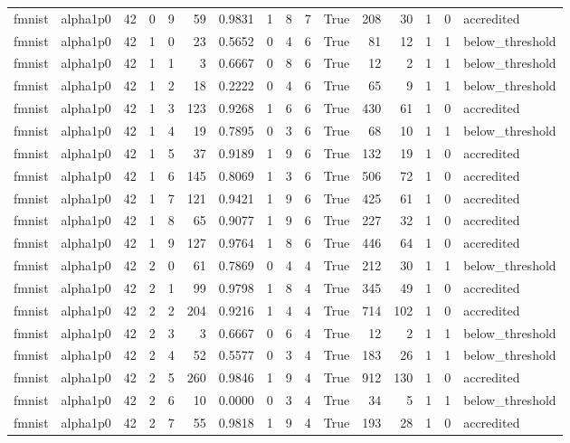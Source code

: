 \begin{tabular}{llrrrrrrrrrrrrrl}
fmnist & alpha1p0 & 42 & 0 & 9 & 59 & 0.9831 & 1 & 8 & 7 & True & 208 & 30 & 1 & 0 & accredited \\
fmnist & alpha1p0 & 42 & 1 & 0 & 23 & 0.5652 & 0 & 4 & 6 & True & 81 & 12 & 1 & 1 & below\_threshold \\
fmnist & alpha1p0 & 42 & 1 & 1 & 3 & 0.6667 & 0 & 8 & 6 & True & 12 & 2 & 1 & 1 & below\_threshold \\
fmnist & alpha1p0 & 42 & 1 & 2 & 18 & 0.2222 & 0 & 4 & 6 & True & 65 & 9 & 1 & 1 & below\_threshold \\
fmnist & alpha1p0 & 42 & 1 & 3 & 123 & 0.9268 & 1 & 6 & 6 & True & 430 & 61 & 1 & 0 & accredited \\
fmnist & alpha1p0 & 42 & 1 & 4 & 19 & 0.7895 & 0 & 3 & 6 & True & 68 & 10 & 1 & 1 & below\_threshold \\
fmnist & alpha1p0 & 42 & 1 & 5 & 37 & 0.9189 & 1 & 9 & 6 & True & 132 & 19 & 1 & 0 & accredited \\
fmnist & alpha1p0 & 42 & 1 & 6 & 145 & 0.8069 & 1 & 3 & 6 & True & 506 & 72 & 1 & 0 & accredited \\
fmnist & alpha1p0 & 42 & 1 & 7 & 121 & 0.9421 & 1 & 9 & 6 & True & 425 & 61 & 1 & 0 & accredited \\
fmnist & alpha1p0 & 42 & 1 & 8 & 65 & 0.9077 & 1 & 9 & 6 & True & 227 & 32 & 1 & 0 & accredited \\
fmnist & alpha1p0 & 42 & 1 & 9 & 127 & 0.9764 & 1 & 8 & 6 & True & 446 & 64 & 1 & 0 & accredited \\
fmnist & alpha1p0 & 42 & 2 & 0 & 61 & 0.7869 & 0 & 4 & 4 & True & 212 & 30 & 1 & 1 & below\_threshold \\
fmnist & alpha1p0 & 42 & 2 & 1 & 99 & 0.9798 & 1 & 8 & 4 & True & 345 & 49 & 1 & 0 & accredited \\
fmnist & alpha1p0 & 42 & 2 & 2 & 204 & 0.9216 & 1 & 4 & 4 & True & 714 & 102 & 1 & 0 & accredited \\
fmnist & alpha1p0 & 42 & 2 & 3 & 3 & 0.6667 & 0 & 6 & 4 & True & 12 & 2 & 1 & 1 & below\_threshold \\
fmnist & alpha1p0 & 42 & 2 & 4 & 52 & 0.5577 & 0 & 3 & 4 & True & 183 & 26 & 1 & 1 & below\_threshold \\
fmnist & alpha1p0 & 42 & 2 & 5 & 260 & 0.9846 & 1 & 9 & 4 & True & 912 & 130 & 1 & 0 & accredited \\
fmnist & alpha1p0 & 42 & 2 & 6 & 10 & 0.0000 & 0 & 3 & 4 & True & 34 & 5 & 1 & 1 & below\_threshold \\
fmnist & alpha1p0 & 42 & 2 & 7 & 55 & 0.9818 & 1 & 9 & 4 & True & 193 & 28 & 1 & 0 & accredited \\

\end{tabular}
